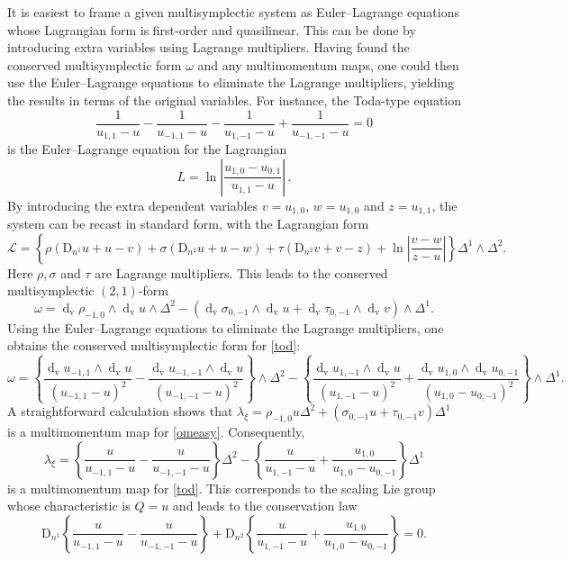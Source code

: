 \documentclass[11pt]{article} %
\numberwithin{equation}{section}
\newcommand{\upd}{\operatorname{d}}
\newcommand{\upv}{\operatorname{v}}
\newcommand{\dv}{\upd_{\upv}\!}
\newcommand{\diff}[1]{\mathrm{D}_{n^{#1}}}
\newcommand{\msL}{\mathscr{L}}
\theoremstyle{plain}
\theoremstyle{definition}
\begin{document}
It is easiest to frame a given multisymplectic system as Euler--Lagrange equations whose Lagrangian form is first-order and quasilinear.
This can be done by introducing extra variables using Lagrange multipliers. Having found the conserved multisymplectic form $\omega$ and any multimomentum maps, one could then use the Euler--Lagrange equations to eliminate the Lagrange multipliers, yielding the results in terms of the original variables. For instance, the Toda-type equation
\begin{equation}\label{tod}
    \frac{1}{u_{1,1}-u}-\frac{1}{u_{-1,1}-u}-\frac{1}{u_{1,-1}-u}+\frac{1}{u_{-1,-1}-u}=0
\end{equation}
is the Euler--Lagrange equation for the Lagrangian
\begin{equation}
    L=\ln\left|\frac{u_{1,0}-u_{0,1}}{u_{1,1}-u}\right| \,.
\end{equation}
By introducing the extra dependent variables $v=u_{1,0}$, $w=u_{1,0}$ and $z=u_{1,1}$, the system can be recast in standard form, with the Lagrangian form
\begin{equation}
    \msL=\left\{\rho(\diff{1}u+u-v)+\sigma(\diff{2}u+u-w)+\tau(\diff{2}v+v-z)+\ln\left|\frac{v-w}{z-u}\right|\right\}\Delta^1\wedge\Delta^2.
\end{equation}
Here $\rho,\sigma$ and $\tau$ are Lagrange multipliers. This leads to the conserved multisymplectic $(2,1)$-form
\begin{equation}\label{omeasy}
    \omega=\dv \rho_{-1,0}\wedge\dv u\wedge\Delta^2-\left(\dv \sigma_{0,-1}\wedge\dv u+\dv \tau_{0,-1}\wedge\dv v\right)\wedge\Delta^1.
\end{equation}
Using the Euler--Lagrange equations to eliminate the Lagrange multipliers, one obtains the conserved multisymplectic form for \eqref{tod}:
\begin{equation}
    \omega=\left\{\frac{\dv u_{-1,1}\wedge\dv u}{(u_{-1,1}-u)^2}-\frac{\dv u_{-1,-1}\wedge\dv u}{(u_{-1,-1}-u)^2}\right\}\wedge\Delta^2-\left\{\frac{\dv u_{1,-1}\wedge\dv u}{(u_{1,-1}-u)^2}+\frac{\dv u_{1,0}\wedge\dv u_{0,-1}}{(u_{1,0}-u_{0,-1})^2}\right\}\wedge\Delta^1.
\end{equation}
A straightforward calculation shows that $\lambda_\xi=\rho_{-1,0}u\Delta^2+(\sigma_{0,-1}u+\tau_{0,-1}v)\Delta^1$ is a multimomentum map for \eqref{omeasy}. Consequently,
\begin{equation}
    \lambda_\xi=\left\{\frac{u}{u_{-1,1}-u}-\frac{u}{u_{-1,-1}-u}\right\}\Delta^2-\left\{\frac{u}{u_{1,-1}-u}+\frac{u_{1,0}}{u_{1,0}-u_{0,-1}}\right\}\Delta^1
\end{equation}
is a multimomentum map for \eqref{tod}. This corresponds to the scaling Lie group whose characteristic is $Q=u$ and leads to the conservation law
\begin{equation}
    \diff{1}\!\left\{\frac{u}{u_{-1,1}-u}-\frac{u}{u_{-1,-1}-u}\right\}+\diff{2}\!\left\{\frac{u}{u_{1,-1}-u}+\frac{u_{1,0}}{u_{1,0}-u_{0,-1}}\right\}=0.
\end{equation}
\end{document}
